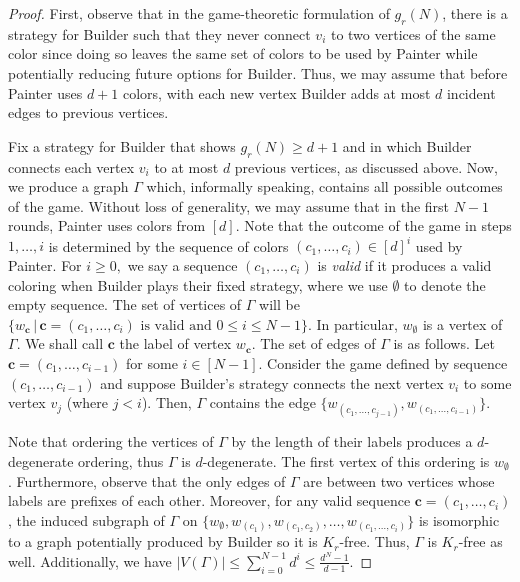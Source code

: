 \documentclass[10pt]{amsart}
\theoremstyle{definition}
\begin{document}
\propobsrestate*
\begin{proof}
    First, observe that in the game-theoretic formulation of $g_r(N)$, there is a strategy for Builder such that they never connect $v_i$ to two vertices of the same color since doing so leaves the same set of colors to be used by Painter while potentially reducing future options for Builder. Thus, we may assume that before Painter uses $d+1$ colors, with each new vertex Builder adds at most $d$ incident edges to previous vertices. 

    Fix a strategy for Builder that shows $g_r(N) \ge d+1$ and in which Builder connects each vertex $v_i$ to at most $d$ previous vertices, as discussed above. Now, we produce a graph $\Gamma$ which, informally speaking, contains all possible outcomes of the game. Without loss of generality, we may assume that in the first $N-1$ rounds, Painter uses colors from $[d]$. Note that the outcome of the game in steps $1, \dots, i$ is determined by the sequence of colors $(c_1, \dots, c_i) \in [d]^i$ used by Painter. For $i\ge 0,$ we say a sequence $(c_1, \dots, c_i)$ is \emph{valid} if it produces a valid coloring when Builder plays their fixed strategy, where we use $\emptyset$ to denote the empty sequence. The set of vertices of $\Gamma$ will be $\{ w_\mathbf{c} \, \vert \, \mathbf{c} = (c_1, \dots, c_i) \text{ is valid and }0\le i\le N-1 \}.$ In particular, $w_{\emptyset}$ is a vertex of $\Gamma$. We shall call $\mathbf{c}$ the label of vertex $w_\mathbf{c}$. The set of edges of $\Gamma$ is as follows. Let $\mathbf{c} = (c_1, \dots, c_{i-1})$ for some $i \in [N-1]$. Consider the game defined by sequence $(c_1, \dots, c_{i-1})$ and suppose Builder's strategy connects the next vertex $v_i$ to some vertex $v_j$ (where $j < i$). Then, $\Gamma$ contains the edge $\{w_{(c_1, \dots, c_{j-1})}, w_{(c_1, \dots, c_{i-1})}\}$.

    Note that ordering the vertices of $\Gamma$ by the length of their labels produces a $d$-degenerate ordering, thus $\Gamma$ is $d$-degenerate. The first vertex of this ordering is $w_{\emptyset}$. Furthermore, observe that the only edges of $\Gamma$ are between two vertices whose labels are prefixes of each other. Moreover, for any valid sequence $\mathbf{c} = (c_1, \dots, c_i)$, the induced subgraph of $\Gamma$ on $\{ w_{\emptyset}, w_{(c_1)}, w_{(c_1, c_2)}, \dots, w_{(c_1, \dots, c_i)}\}$ is isomorphic to a graph potentially produced by Builder so it is $K_r$-free. Thus, $\Gamma$ is $K_r$-free as well. Additionally, we have $|V(\Gamma)| \le \sum_{i=0}^{N-1} d^i \le \frac{d^{N} - 1}{d-1}.$    


\end{proof}
\end{document}
